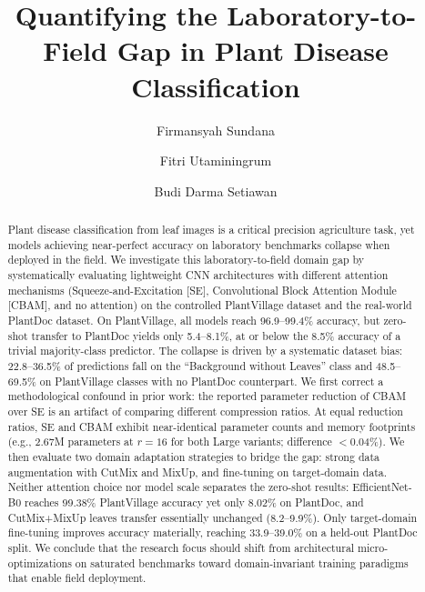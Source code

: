 \documentclass[preprint,12pt]{elsarticle}
\begin{document}
\begin{frontmatter}

\title{Quantifying the Laboratory-to-Field Gap in Plant Disease Classification}

\author[1]{Firmansyah Sundana}
\author[1]{Fitri Utaminingrum}
\author[1]{Budi Darma Setiawan}


\begin{abstract}
Plant disease classification from leaf images is a critical precision agriculture task, yet models achieving near-perfect accuracy on laboratory benchmarks collapse when deployed in the field. We investigate this laboratory-to-field domain gap by systematically evaluating lightweight CNN architectures with different attention mechanisms (Squeeze-and-Excitation [SE], Convolutional Block Attention Module [CBAM], and no attention) on the controlled PlantVillage dataset and the real-world PlantDoc dataset. On PlantVillage, all models reach 96.9--99.4\% accuracy, but zero-shot transfer to PlantDoc yields only 5.4--8.1\%, at or below the 8.5\% accuracy of a trivial majority-class predictor. The collapse is driven by a systematic dataset bias: 22.8--36.5\% of predictions fall on the ``Background without Leaves'' class and 48.5--69.5\% on PlantVillage classes with no PlantDoc counterpart. We first correct a methodological confound in prior work: the reported parameter reduction of CBAM over SE is an artifact of comparing different compression ratios. At equal reduction ratios, SE and CBAM exhibit near-identical parameter counts and memory footprints (e.g., 2.67M parameters at $r=16$ for both Large variants; difference $<$0.04\%). We then evaluate two domain adaptation strategies to bridge the gap: strong data augmentation with CutMix and MixUp, and fine-tuning on target-domain data. Neither attention choice nor model scale separates the zero-shot results: EfficientNet-B0 reaches 99.38\% PlantVillage accuracy yet only 8.02\% on PlantDoc, and CutMix+MixUp leaves transfer essentially unchanged (8.2--9.9\%). Only target-domain fine-tuning improves accuracy materially, reaching 33.9--39.0\% on a held-out PlantDoc split. We conclude that the research focus should shift from architectural micro-optimizations on saturated benchmarks toward domain-invariant training paradigms that enable field deployment.
\end{abstract}


\end{frontmatter}
\end{document}
